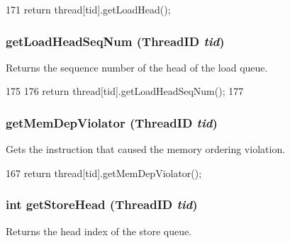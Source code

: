 \begin{DoxyCode}
171     { return thread[tid].getLoadHead(); }
\end{DoxyCode}
\hypertarget{classLSQ_a190e0bb202a3dc8a203e18c67b334729}{
\subsubsection[{getLoadHeadSeqNum}]{ getLoadHeadSeqNum ({\bf ThreadID} {\em tid})}}
\label{classLSQ_a190e0bb202a3dc8a203e18c67b334729}
Returns the sequence number of the head of the load queue. 


\begin{DoxyCode}
175     {
176         return thread[tid].getLoadHeadSeqNum();
177     }
\end{DoxyCode}
\hypertarget{classLSQ_a62fec9ff095a709800a97ac7a3d27c78}{
\subsubsection[{getMemDepViolator}]{ getMemDepViolator ({\bf ThreadID} {\em tid})}}
\label{classLSQ_a62fec9ff095a709800a97ac7a3d27c78}
Gets the instruction that caused the memory ordering violation. 


\begin{DoxyCode}
167     { return thread[tid].getMemDepViolator(); }
\end{DoxyCode}
\hypertarget{classLSQ_a0645614312b9a74b4adb8bc83b4f34ef}{
\subsubsection[{getStoreHead}]{\setlength{\rightskip}{0pt plus 5cm}int getStoreHead ({\bf ThreadID} {\em tid})}}
\label{classLSQ_a0645614312b9a74b4adb8bc83b4f34ef}
Returns the head index of the store queue. 


